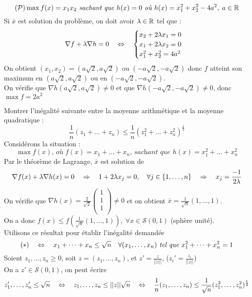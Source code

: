 \begin{exemple}
\[ \mathcal{(P)} \max f(x)=x_1x_2 \textit{ sachant que } h(x)=0 \textit{ où } h(x)=x_1^2+x_2^2-4a^2, \; a\in\mathbb{R} \]
Si $\bar{x}$ est solution du problème, on doit avoir $\lambda\in\mathbb{R}$ tel que : \[ \nabla f+\lambda \nabla h=0 \quad\Leftrightarrow\quad \begin{cases} x_2+2\lambda x_1=0 \\ x_1+2\lambda x_2=0 \\ x_1^2+x_2^2=4a^2 \end{cases} \]
On obtient $(x_1,x_2)=(a\sqrt{2},a\sqrt{2})$ ou $(-a\sqrt{2},-a\sqrt{2})$ donc $f$ atteint son maximum en $(a\sqrt{2},a\sqrt{2})$ ou en $(-a\sqrt{2},-a\sqrt{2})$.\\
On vérifie que $\nabla h(a\sqrt{2},a\sqrt{2}) \ne 0$ et que $\nabla h(-a\sqrt{2},-a\sqrt{2}) \ne 0$, donc $\max f = 2a^2$
\end{exemple}

\begin{exemple}
Montrer l'inégalité suivante entre la moyenne arithmétique et la moyenne quadratique : \[ \frac{1}{n}(z_1+\dots+z_n) \leq \frac{1}{n}(z_1^2+\dots+z_n^2)^\frac{1}{2} \]
Considérons la situation : \[ \max f(x)\textit{, où } f(x)=x_1+\dots+x_n \textit{, sachant que } h(x)=x_1^2+\dots+x_n^2 \]
Par le théorème de Lagrange, $\bar{x}$ est solution de \[ \nabla f(x)+\lambda\nabla h(x)=0 \quad\Rightarrow\quad 1+2\lambda x_j=0, \quad\forall j\in\{1,\dots,n\} \quad\Rightarrow\quad x_j=\frac{-1}{2\lambda} \]
On vérifie que $\nabla h(x)=\frac{2}{\sqrt{2}}\begin{pmatrix} 1\\ 1\\ 1\\ \end{pmatrix} \ne 0$ et on obtient $\bar{x}=\frac{1}{\sqrt{n}}(1,\dots,1)$.\\
On a donc $f(x)\leq f(\frac{1}{\sqrt{n}}(1,\dots,1)),\;\forall x\in\mathcal{S}(0,1)$ (sphère unité).\\
Utilisons ce résultat pour établir l'inégalité demandée \[ (*) \quad\Leftrightarrow\quad x_1+\dots+x_n\leq \sqrt{n} \quad \forall (x_1,\dots,x_n)\textit{ tel que }x_1^2+\dots+x_n^2 =1 \]
Soient $z_1, \dots,z_n \geq 0$, soit $z=(z_1, \dots,z_n)$, et $z'=\frac{z}{||z||}$, ($z_i'=\frac{z_i}{||z||}$)\\
On a $z'\in\mathcal{S}(0,1)$, on peut écrire \[z'_1, \dots,z_n' \leq \sqrt{n} \quad\Leftrightarrow\quad z_1, \dots,z_n \leq ||z||\sqrt{n} \quad\Leftrightarrow\quad \frac{1}{n}(z_1, \dots,z_n)\leq\frac{1}{\sqrt{n}}(z_1^2, \dots,z_n^2)^\frac{1}{2} \]
\end{exemple}

